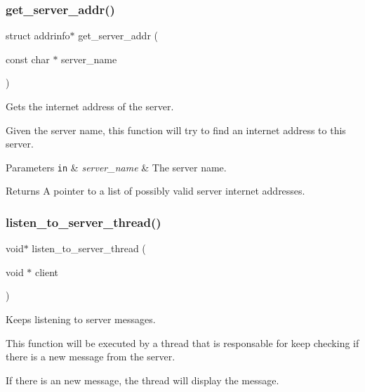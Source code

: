 \subsubsection{\texorpdfstring{get\+\_\+server\+\_\+addr()}{get\_server\_addr()}}
{\footnotesize\ttfamily struct addrinfo$\ast$ get\+\_\+server\+\_\+addr (\begin{DoxyParamCaption}\item[{const char $\ast$}]{server\+\_\+name }\end{DoxyParamCaption})}



Gets the internet address of the server. 

Given the server name, this function will try to find an internet address to this server.


\begin{DoxyParams}[1]{Parameters}
\mbox{\tt in}  & {\em server\+\_\+name} & The server name.\\
\hline
\end{DoxyParams}
\begin{DoxyReturn}{Returns}
A pointer to a list of possibly valid server internet addresses. 
\end{DoxyReturn}
\mbox{\label{zip-zop-client_8c_aed34485ec5832caf3b952362921111b4}} 
\subsubsection{\texorpdfstring{listen\+\_\+to\+\_\+server\+\_\+thread()}{listen\_to\_server\_thread()}}
{\footnotesize\ttfamily void$\ast$ listen\+\_\+to\+\_\+server\+\_\+thread (\begin{DoxyParamCaption}\item[{void $\ast$}]{client }\end{DoxyParamCaption})}



Keeps listening to server messages. 

This function will be executed by a thread that is responsable for keep checking if there is a new message from the server.

If there is an new message, the thread will display the message.


